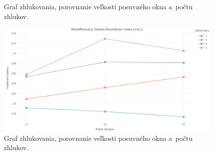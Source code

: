 \documentclass[a4paper,twoside,slovak,12pt,appendix]{article}
\begin{document}
\begin{appendices}
\begin{figure}[htbp]
  \caption{Graf zhlukovania, porovnanie veľkosti posuvného okna a~počtu zhlukov.}
\end{figure}
\begin{figure}[htbp]
  \centering
  \includegraphics[width=\textwidth]{cvi/dtw_basic_workdays_sparse/201902271850-DBstar-dtw_basic_workdays_sparse.png}
  \caption{Graf zhlukovania, porovnanie veľkosti posuvného okna a~počtu zhlukov.}
\end{figure}


\end{appendices}
\end{document}
